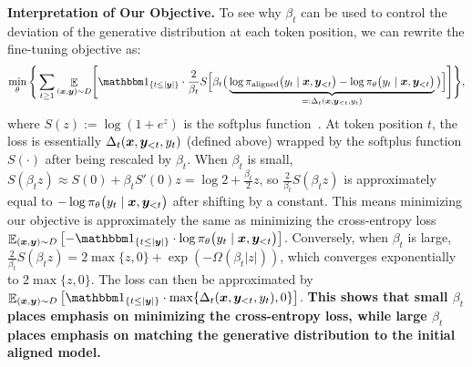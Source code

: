 \textbf{Interpretation of Our Objective.}
To see why $\beta_t$ can be used to control the deviation of the generative distribution at each token position, we can rewrite the fine-tuning objective as:
\begin{align}
    \min_{\theta} \Bigg\{ \sum_{t \ge 1} \mathop{\mathbb E}_{(\bx,\by)\sim D}\!\Bigg[ \onec{t \le |\by|} \cdot \frac{2}{\beta_t} S\Big[\beta_t \big(\underbrace{\log \pialigned\big(y_t \mid \bx, \by_{<t} \big) - \log \pi_{\theta}\big(y_t \mid \bx, \by_{<t} \big)}_{=: \Delta_t(\bx, \by_{<t}, y_t)} \big) \Big] \Bigg] \Bigg\},
\end{align}
where $S(z) := \log(1 + e^{z})$ is the softplus function~\citep{dugas2000incorporating}.
At token position $t$, the loss is essentially $\Delta_t(\bm{x}, \bm{y}_{<t}, y_t)$ (defined above) wrapped by the softplus function $S(\cdot)$ after being rescaled by $\beta_t$.
When $\beta_t$ is small, $S(\beta_t z) \approx S(0) + \beta_t S'(0) z = \log 2 + \frac{\beta_t}{2} z$,
so $\frac{2}{\beta_t}S(\beta_t z)$ is approximately equal to $- \log \pi_{\theta}\big(y_t \mid \bm{x}, \bm{y}_{<t} \big)$ after shifting by a constant.
This means minimizing our objective is approximately the same as minimizing the cross-entropy loss 
$\mathop{\mathbb E}_{(\bx,\by)\sim D} \left[ - \onec{t \le |\by|} \cdot  \log \pi_{\theta}\big(y_t \mid \bx, \by_{<t} \big) \right]$. %
Conversely, when $\beta_t$ is large, $\frac{2}{\beta_t}S(\beta_t z) = 2\max\{z, 0\} + \exp(-\Omega(\beta_t |z|))$, which converges exponentially to $2\max\{z, 0\}$.
The loss can then be approximated by $\mathop{\mathbb E}_{(\bx,\by)\sim D}\left[ \onec{t \le |\by|} \cdot \max\{ \Delta_t(\bx, \by_{<t}, y_t), 0 \}\right]$.
\textbf{This shows that small $\beta_t$ places emphasis on minimizing the cross-entropy loss, while large $\beta_t$ places emphasis on matching the generative distribution to the initial aligned model. }
